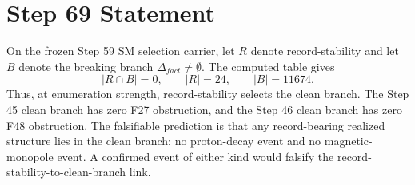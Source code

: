 \documentclass[11pt]{article}
\begin{document}
\section*{Step 69 Statement}
On the frozen Step 59 SM selection carrier, let $R$ denote record-stability and let $B$ denote the breaking branch $\Delta_{fact}\ne\emptyset$. The computed table gives
\[
  |R\cap B|=0,\qquad |R|=24,\qquad |B|=11674.
\]
Thus, at enumeration strength, record-stability selects the clean branch. The Step 45 clean branch has zero F27 obstruction, and the Step 46 clean branch has zero F48 obstruction. The falsifiable prediction is that any record-bearing realized structure lies in the clean branch: no proton-decay event and no magnetic-monopole event. A confirmed event of either kind would falsify the record-stability-to-clean-branch link.
\end{document}
